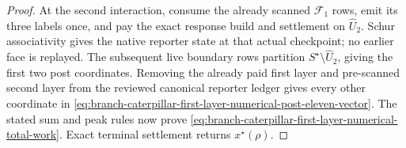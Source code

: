 \begin{proof}
At the second interaction, consume the already scanned $\mathcal F_1$ rows,
emit its three labels once, and pay the exact response build and settlement
on $\widehat U_2$.  Schur associativity gives the native reporter state at
that actual checkpoint; no earlier face is replayed.  The subsequent live
boundary rows partition $S^\star\setminus\widehat U_2$, giving the first two
post coordinates.  Removing the already paid first layer and pre-scanned
second layer from the reviewed canonical reporter ledger gives every other
coordinate in
\cref{eq:branch-caterpillar-first-layer-numerical-post-eleven-vector}.
The stated sum and peak rules now prove
\cref{eq:branch-caterpillar-first-layer-numerical-total-work}.  Exact terminal
settlement returns $x^\star(\rho)$.
\end{proof}
